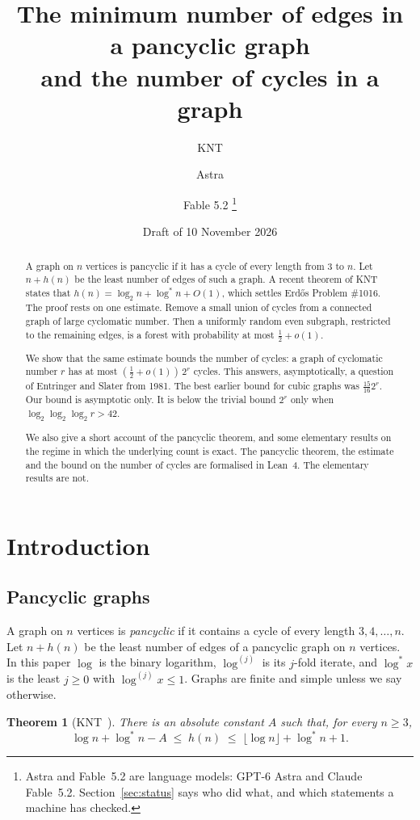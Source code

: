 \documentclass[11pt]{article}
\title{The minimum number of edges in a pancyclic graph\\ and the number of cycles in a graph}
\author{KNT \and Astra \and Fable 5.2%
\thanks{Astra and Fable~5.2 are language models: GPT-6 Astra and Claude Fable~5.2.
Section~\ref{sec:status} says who did what, and which statements a machine has checked.}}
\date{Draft of 10 November 2026}
\newtheorem{theorem}{Theorem}[section]
\theoremstyle{definition}
\theoremstyle{remark}
\newcommand{\lgs}{\log^{*}}
\newcommand{\lgk}[1]{\log^{(#1)}}
\newcommand{\half}{\tfrac12}
\numberwithin{equation}{section}
\begin{document}
\maketitle

\begin{abstract}
A graph on $n$ vertices is pancyclic if it has a cycle of every length from $3$ to $n$. Let $n+h(n)$
be the least number of edges of such a graph. A recent theorem of KNT states that
$h(n)=\log_2 n+\lgs n+O(1)$, which settles Erd\H{o}s Problem \#1016. The proof rests on one estimate. Remove a small union of cycles
from a connected graph of large cyclomatic number. Then a uniformly random even subgraph, restricted
to the remaining edges, is a forest with probability at most $\half+o(1)$.

We show that the same estimate bounds the number of cycles: a graph of cyclomatic number $r$ has at
most $(\half+o(1))\,2^{r}$ cycles. This answers, asymptotically, a question of Entringer and Slater
from 1981. The best earlier bound for cubic graphs was $\frac{15}{16}2^{r}$. Our bound is asymptotic
only. It is below the trivial bound $2^{r}$ only when $\log_2\log_2\log_2 r>42$.

We also give a short account of the pancyclic theorem, and some elementary results on the regime in
which the underlying count is exact. The pancyclic theorem, the estimate and the bound on the number
of cycles are formalised in Lean~4. The elementary results are not.
\end{abstract}

\section{Introduction}\label{sec:intro}

\subsection{Pancyclic graphs}

A graph on $n$ vertices is \emph{pancyclic} if it contains a cycle of every length $3,4,\dots,n$.
Let $n+h(n)$ be the least number of edges of a pancyclic graph on $n$ vertices. In this paper $\log$
is the binary logarithm, $\lgk{j}$ is its $j$-fold iterate, and $\lgs x$ is the least $j\ge0$ with
$\lgk{j}x\le1$. Graphs are finite and simple unless we say otherwise.

\begin{theorem}[KNT~\cite{KNT}]\label{thm:main}
There is an absolute constant $A$ such that, for every $n\ge3$,
\[
  \log n+\lgs n-A\;\le\;h(n)\;\le\;\lfloor\log n\rfloor+\lgs n+1 .
\]
\end{theorem}
\end{document}
